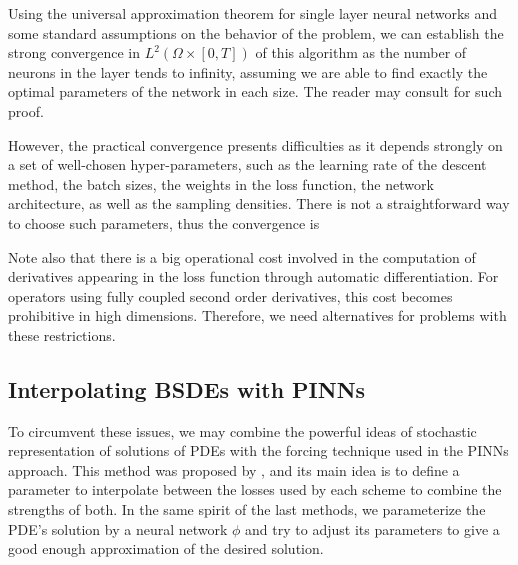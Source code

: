 Using the universal approximation theorem for single layer neural networks and some standard assumptions on the behavior of the problem, we can establish the strong convergence in $L^2(\Omega\times [0,T])$ of this algorithm as the number of neurons in the layer tends to infinity, assuming we are able to find exactly the optimal parameters of the network in each size. The reader may consult  \cite{sirignano_dgm_2018} for such proof.

However, the practical convergence presents difficulties as it depends strongly on a set of well-chosen hyper-parameters, such as the learning rate of the descent method, the batch sizes, the weights in the loss function, the network architecture, as well as the sampling densities. There is not a straightforward way to choose such parameters, thus the convergence is 

Note also that there is a big operational cost involved in the computation of derivatives appearing in the loss function through automatic differentiation. For operators using fully coupled second order derivatives, this cost becomes prohibitive in high dimensions. Therefore, we need alternatives for problems with these restrictions.
\subsection{Interpolating BSDEs with PINNs}
To circumvent these issues, we may combine the powerful ideas of stochastic representation of solutions of PDEs with the forcing technique used in the PINNs approach. This method was proposed by \cite{nusken_interpolating_2023}, and its main idea is to define a parameter to interpolate between the losses used by each scheme to combine the strengths of both. In the same spirit of the last methods, we parameterize the PDE's solution by a neural network $\phi$ and try to adjust its parameters to give a good enough approximation of the desired solution.

